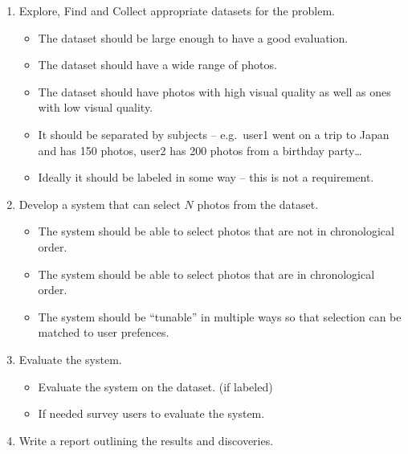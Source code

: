 \documentclass[11pt,a4paper]{article}
\begin{document}
\begin{enumerate}
  \item Explore, Find and Collect appropriate datasets for the problem.
  \begin{itemize}
    \item The dataset should be large enough to have a good evaluation.
    \item The dataset should have a wide range of photos.
    \item The dataset should have photos with high visual quality as well as ones with low visual quality.
    \item It should be separated by subjects -- e.g.\ user1 went on a trip to Japan and has 150 photos, user2 has 200 photos from a birthday party\ldots
    \item Ideally it should be labeled in some way -- this is not a requirement.
  \end{itemize}

  \item Develop a system that can select $N$ photos from the dataset.
  \begin{itemize}
    \item The system should be able to select photos that are not in chronological order.
    \item The system should be able to select photos that are in chronological order.
    \item The system should be ``tunable'' in multiple ways so that selection can be matched to user prefences.
  \end{itemize}

  \item Evaluate the system.
  \begin{itemize}
    \item Evaluate the system on the dataset. (if labeled)
    \item If needed survey users to evaluate the system.
  \end{itemize}

  \item Write a report outlining the results and discoveries.
\end{enumerate}
\end{document}
